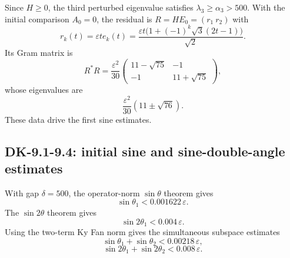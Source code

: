 Since $H\ge0$, the third perturbed eigenvalue satisfies $\lambda_3\ge\alpha_3>500$.  With the initial comparison $A_0=0$, the residual is $R=HE_0=(r_1\ r_2)$ with
\[
 r_k(t)=\varepsilon t e_k(t)
 =\frac{\varepsilon t\bigl(1+(-1)^k\sqrt3(2t-1)\bigr)}{\sqrt2}.
\]
Its Gram matrix is
\[
 R^*R=\frac{\varepsilon^2}{30}
 \begin{pmatrix}
 11-\sqrt{75}&-1\\-1&11+\sqrt{75}
 \end{pmatrix},
\]
whose eigenvalues are
\[
 \frac{\varepsilon^2}{30}(11\pm\sqrt{76}).
\]
These data drive the first sine estimates.

\subsection*{DK-9.1-9.4: initial sine and sine-double-angle estimates}
With gap $\delta=500$, the operator-norm $\sin\theta$ theorem gives
\begin{equation}
 \sin\theta_1<0.001622\,\varepsilon.
 \tag{9.1}
\end{equation}
The $\sin2\theta$ theorem gives
\begin{equation}
 \sin2\theta_1<0.004\,\varepsilon.
 \tag{9.2}
\end{equation}
Using the two-term Ky Fan norm gives the simultaneous subspace estimates
\begin{equation}
 \sin\theta_1+\sin\theta_2<0.00218\,\varepsilon,
 \tag{9.3}
\end{equation}
\begin{equation}
 \sin2\theta_1+\sin2\theta_2<0.008\,\varepsilon.
 \tag{9.4}
\end{equation}

